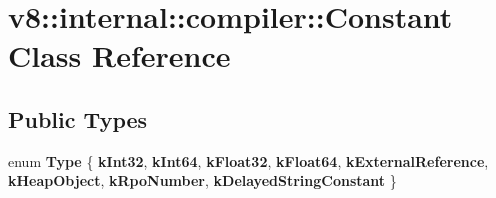 \hypertarget{classv8_1_1internal_1_1compiler_1_1Constant}{}\section{v8\+:\+:internal\+:\+:compiler\+:\+:Constant Class Reference}
\label{classv8_1_1internal_1_1compiler_1_1Constant}
\subsection*{Public Types}
\begin{DoxyCompactItemize}
\item 
\mbox{\label{classv8_1_1internal_1_1compiler_1_1Constant_a77b19008bb8c006158bcca90c4b45fb5}} 
enum {\bfseries Type} \{ \newline
{\bfseries k\+Int32}, 
{\bfseries k\+Int64}, 
{\bfseries k\+Float32}, 
{\bfseries k\+Float64}, 
\newline
{\bfseries k\+External\+Reference}, 
{\bfseries k\+Heap\+Object}, 
{\bfseries k\+Rpo\+Number}, 
{\bfseries k\+Delayed\+String\+Constant}
 \}
\end{DoxyCompactItemize}
